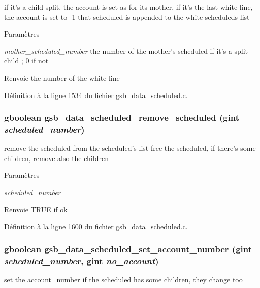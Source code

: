 if it's a child split, the account is set as for its mother, if it's the last white line, the account is set to -\/1 that scheduled is appended to the white scheduleds list


\begin{DoxyParams}{Paramètres}
\item[{\em mother\_\-scheduled\_\-number}]the number of the mother's scheduled if it's a split child ; 0 if not\end{DoxyParams}
\begin{DoxyReturn}{Renvoie}
the number of the white line 
\end{DoxyReturn}


Définition à la ligne 1534 du fichier gsb\_\-data\_\-scheduled.c.

\subsubsection[{gsb\_\-data\_\-scheduled\_\-remove\_\-scheduled}]{\setlength{\rightskip}{0pt plus 5cm}gboolean gsb\_\-data\_\-scheduled\_\-remove\_\-scheduled (gint {\em scheduled\_\-number})}\label{gsb__data__scheduled_8h_a234f69a2294c397daaa9e6ddd771e297}
remove the scheduled from the scheduled's list free the scheduled, if there's some children, remove also the children


\begin{DoxyParams}{Paramètres}
\item[{\em scheduled\_\-number}]\end{DoxyParams}
\begin{DoxyReturn}{Renvoie}
TRUE if ok 
\end{DoxyReturn}


Définition à la ligne 1600 du fichier gsb\_\-data\_\-scheduled.c.

\subsubsection[{gsb\_\-data\_\-scheduled\_\-set\_\-account\_\-number}]{\setlength{\rightskip}{0pt plus 5cm}gboolean gsb\_\-data\_\-scheduled\_\-set\_\-account\_\-number (gint {\em scheduled\_\-number}, \/  gint {\em no\_\-account})}\label{gsb__data__scheduled_8h_a07c390be754930ef6fc318936fb358bd}
set the account\_\-number if the scheduled has some children, they change too


